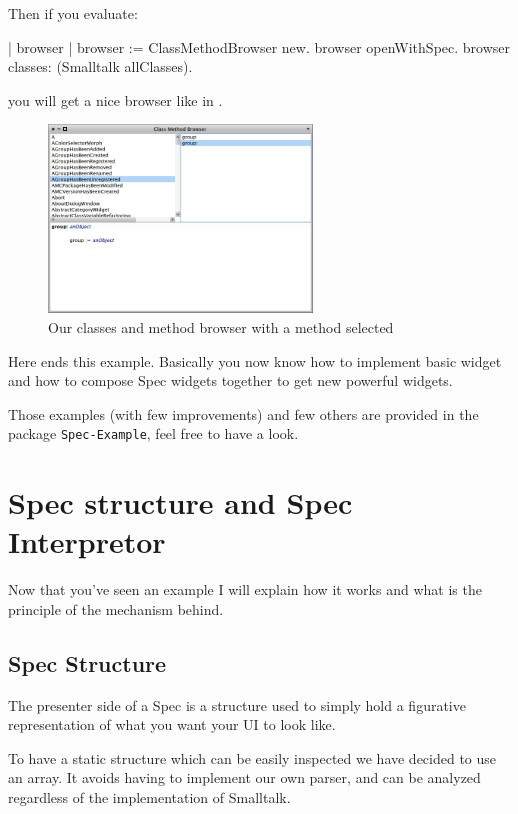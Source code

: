 \documentclass[a4paper,10pt,twoside]{book}
\begin{document}
Then if you evaluate:

\begin{code}{}
| browser |
browser := ClassMethodBrowser new.
browser openWithSpec.
browser classes: (Smalltalk allClasses).
\end{code}

you will get a nice browser like in .


\begin{figure}[ht]
\begin{center}
	\includegraphics[width=7cm]{MethodBrowser6}
	\caption{Our classes and method browser with a method selected}
\end{center}
\end{figure}


Here ends this example. 
Basically you now know how to implement basic widget and how to compose Spec widgets together to get new powerful widgets.

Those examples (with few improvements) and few others are provided in the package \verb+Spec-Example+, feel free to have a look.

\section{Spec structure and Spec Interpretor}

Now that you've seen an example I will explain how it works and what is the principle of the mechanism behind.

\subsection{Spec Structure}\label{spec_structure}

The presenter side of a Spec is a structure used to simply hold a figurative representation of what you want your UI to look like. 

To have a static structure which can be easily inspected we have decided to use an array. It avoids having to implement our own parser, and can be analyzed regardless of the implementation of Smalltalk.
\end{document}
